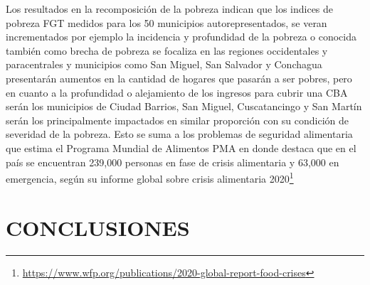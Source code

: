 Los resultados en la recomposición de la pobreza indican que los indices de pobreza FGT medidos para los 50 municipios autorepresentados, se veran incrementados por ejemplo la incidencia y profundidad de la pobreza o conocida también como brecha de pobreza se focaliza en las regiones occidentales y paracentrales y municipios como San Miguel, San Salvador y Conchagua presentarán aumentos en la cantidad de hogares que pasarán a ser pobres, pero en cuanto a la profundidad o alejamiento de los ingresos para cubrir una CBA serán los municipios de Ciudad Barrios, San Miguel, Cuscatancingo y San Martín serán los principalmente impactados en similar proporción con su condición de severidad de la pobreza. Esto se suma a los problemas de seguridad alimentaria que estima el Programa Mundial de Alimentos PMA en donde destaca que en el país se encuentran 239,000 personas en fase de crisis alimentaria y 63,000 en emergencia, según su informe global sobre crisis alimentaria 2020\footnote{\href{https://www.wfp.org/publications/2020-global-report-food-crises}{https://www.wfp.org/publications/2020-global-report-food-crises}} 

\newpage
\section{CONCLUSIONES}

